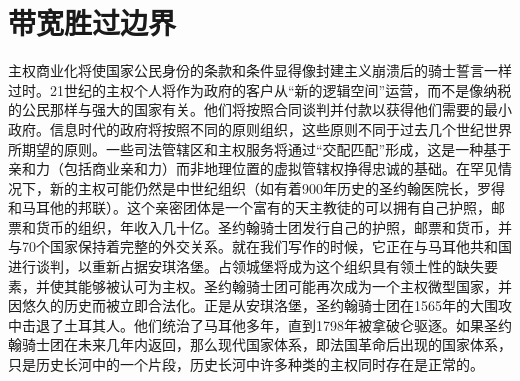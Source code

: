 \section{带宽胜过边界}
\begin{paracol}{2}[]
主权商业化将使国家公民身份的条款和条件显得像封建主义崩溃后的骑士誓言一样过时。21世纪的主权个人将作为政府的客户从“新的逻辑空间”运营，而不是像纳税的公民那样与强大的国家有关。他们将按照合同谈判并付款以获得他们需要的最小政府。信息时代的政府将按照不同的原则组织，这些原则不同于过去几个世纪世界所期望的原则。一些司法管辖区和主权服务将通过“交配匹配”形成，这是一种基于亲和力（包括商业亲和力）而非地理位置的虚拟管辖权挣得忠诚的基础。在罕见情况下，新的主权可能仍然是中世纪组织（如有着900年历史的圣约翰医院长，罗得和马耳他的邦联）。这个亲密团体是一个富有的天主教徒的可以拥有自己护照，邮票和货币的组织，年收入几十亿。圣约翰骑士团发行自己的护照，邮票和货币，并与70个国家保持着完整的外交关系。就在我们写作的时候，它正在与马耳他共和国进行谈判，以重新占据安琪洛堡。占领城堡将成为这个组织具有领土性的缺失要素，并使其能够被认可为主权。圣约翰骑士团可能再次成为一个主权微型国家，并因悠久的历史而被立即合法化。正是从安琪洛堡，圣约翰骑士团在1565年的大围攻中击退了土耳其人。他们统治了马耳他多年，直到1798年被拿破仑驱逐。如果圣约翰骑士团在未来几年内返回，那么现代国家体系，即法国革命后出现的国家体系，只是历史长河中的一个片段，历史长河中许多种类的主权同时存在是正常的。


\end{paracol}
